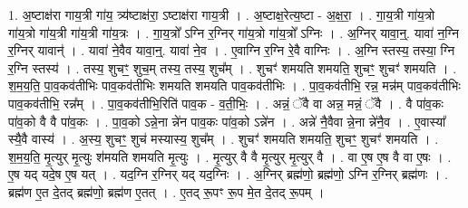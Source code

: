 \documentclass[17pt]{extarticle}
\begin{document}
1. अ॒ष्टाक्ष॑रा गाय॒त्री गा॑य॒ त्र्य॑ष्टाक्ष॑रा॒ ऽष्टाक्ष॑रा गाय॒त्री । . अ॒ष्टाक्ष॒रेत्य॒ष्टा - अ॒क्ष॒रा॒ । . गा॒य॒त्री गा॑य॒त्रो गा॑य॒त्रो गा॑य॒त्री गा॑य॒त्री गा॑य॒त्रः । . गा॒य॒त्रो᳚ ऽग्नि र॒ग्निर् गा॑य॒त्रो गा॑य॒त्रो᳚ ऽग्निः । . अ॒ग्निर् यावा॒न्॒. यावा॑ न॒ग्नि र॒ग्निर् यावान्॑ । . यावा॑ ने॒वैव यावा॒न्॒. यावा॑ ने॒व । . ए॒वाग्नि र॒ग्नि रे॒वै वाग्निः । . अ॒ग्नि स्तस्य॒ तस्या॒ ग्नि र॒ग्नि स्तस्य॑ । . तस्य॒ शुचꣳ॒॒ शुच॒म् तस्य॒ तस्य॒ शुच᳚म् । . शुचꣳ॑ शमयति शमयति॒ शुचꣳ॒॒ शुचꣳ॑ शमयति । . श॒म॒य॒ति॒ पा॒व॒कव॑तीभिः पाव॒कव॑तीभिः शमयति शमयति पाव॒कव॑तीभिः । . पा॒व॒कव॑तीभि॒ रन्न॒ मन्न॑म् पाव॒कव॑तीभिः पाव॒कव॑तीभि॒ रन्न᳚म् । . पा॒व॒कव॑तीभि॒रिति॑ पाव॒क - व॒ती॒भिः॒ । . अन्नं॒ ॅवै वा अन्न॒ मन्नं॒ ॅवै । . वै पा॑व॒कः पा॑व॒को वै वै पा॑व॒कः । . पा॒व॒को ऽन्ने॒ना न्ने॑न पाव॒कः पा॑व॒को ऽन्ने॑न । . अन्ने॑ नै॒वैवा न्ने॒ना न्ने॑नै॒व । . ए॒वास्या᳚ स्यै॒वै वास्य॑ । . अ॒स्य॒ शुचꣳ॒॒ शुच॑ मस्यास्य॒ शुच᳚म् । . शुचꣳ॑ शमयति शमयति॒ शुचꣳ॒॒ शुचꣳ॑ शमयति । . श॒म॒य॒ति॒ मृ॒त्युर् मृ॒त्युः श॑मयति शमयति मृ॒त्युः । . मृ॒त्युर् वै वै मृ॒त्युर् मृ॒त्युर् वै । . वा ए॒ष ए॒ष वै वा ए॒षः । . ए॒ष यद् यदे॒ष ए॒ष यत् । . यद॒ग्नि र॒ग्निर् यद् यद॒ग्निः । . अ॒ग्निर् ब्रह्म॑णो॒ ब्रह्म॑णो॒ ऽग्नि र॒ग्निर् ब्रह्म॑णः । . ब्रह्म॑ण ए॒त दे॒तद् ब्रह्म॑णो॒ ब्रह्म॑ण ए॒तत् । . ए॒तद् रू॒पꣳ रू॒प मे॒त दे॒तद् रू॒पम् । \newline
\end{document}
